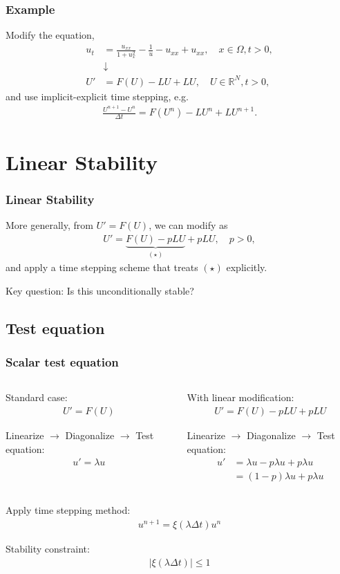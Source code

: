 \documentclass[hyperref={pdfpagelabels=false}]{beamer}
\begin{document}
\begin{frame}
	\frametitle{Example}
Modify the equation,
\begin{align*}
u_t &= \frac{u_{xx}}{1 + u_x^2} - \frac{1}{u} - u_{xx} + u_{xx}, \quad x\in \Omega, t>0, 
\\
&\downarrow 
\\
U' &= F(U) - LU + LU, \quad U\in \mathbb{R}^N, t > 0,
\end{align*}
and use implicit-explicit time stepping, e.g.
\begin{align*}
\frac{U^{n+1} - U^n}{\Delta t} = F(U^n) - LU^n + LU^{n+1}.
\end{align*}
\end{frame}

\section{Linear Stability} 
\begin{frame}
\frametitle{Linear Stability}
More generally, from $U'=F(U)$, we can modify as 
\begin{align*}
 U' = \underbrace{F(U) - pLU}_{(\star)} + pLU, \quad p > 0,
\end{align*}
and apply a time stepping scheme that treats $(\star)$ explicitly.

Key question: Is this unconditionally stable? 	
\end{frame}
\subsection{Test equation}
\begin{frame}
	\frametitle{Scalar test equation}
\begin{columns}
	\begin{column}{0.46\textwidth}
Standard case:
\begin{align*} 
U' = F(U)
\end{align*} 

Linearize $\to$ Diagonalize $\to$ Test equation: 
\begin{align*} 
u' = \lambda u
\end{align*} 
	\end{column}
	\begin{column}{0.46\textwidth}
With linear modification: 
\begin{align*} 
U' = F(U) - pLU + pLU
\end{align*}

Linearize $\to$ Diagonalize $\to$ Test equation: 
\begin{align*}
u' &= \lambda u - p\lambda u + p\lambda u 
\\
&= (1-p)\lambda u + p\lambda u 
\end{align*}
		\end{column}
\end{columns}
Apply time stepping method: 
\begin{align*} 
u^{n+1} = \xi(\lambda\Delta t) u^n
\end{align*} 

Stability constraint: 
\begin{align*}
\left\vert \xi(\lambda\Delta t)\right\vert \leq 1
\end{align*}
\end{frame}
\end{document}
